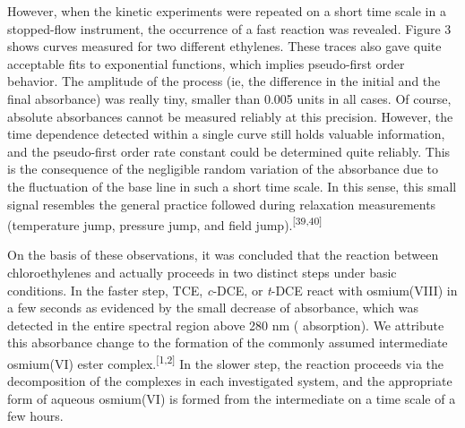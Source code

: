 \documentclass{article}
\begin{document}
However, when the kinetic experiments were repeated on a short time scale in a stopped-flow instrument, the occurrence of a fast reaction was revealed. Figure 3 shows curves measured for two different ethylenes. These traces also gave quite acceptable fits to exponential functions, which implies pseudo-first order behavior. The amplitude of the process (ie, the difference in the initial and the final absorbance) was really tiny, smaller than 0.005 units in all cases. Of course, absolute absorbances cannot be measured reliably at this precision. However, the time dependence detected within a single curve still holds valuable information, and the pseudo-first order rate constant could be determined quite reliably. This is the consequence of the negligible random variation of the absorbance due to the fluctuation of the base line in such a short time scale. In this sense, this small signal resembles the general practice followed during relaxation measurements (temperature jump, pressure jump, and field jump).\textsuperscript{[39,40]}

On the basis of these observations, it was concluded that the reaction between chloroethylenes and  actually proceeds in two distinct steps under basic conditions. In the faster step, TCE, \emph{c}-DCE, or \emph{t}-DCE react with osmium(VIII) in a few seconds as evidenced by the small decrease of absorbance, which was detected in the entire spectral region above 280 nm ( absorption). We attribute this absorbance change to the formation of the commonly assumed intermediate osmium(VI) ester complex.\textsuperscript{[1,2]} In the slower step, the reaction proceeds via the decomposition of the complexes in each investigated system, and the appropriate form of aqueous osmium(VI) is formed from the intermediate on a time scale of a few hours.
\end{document}
